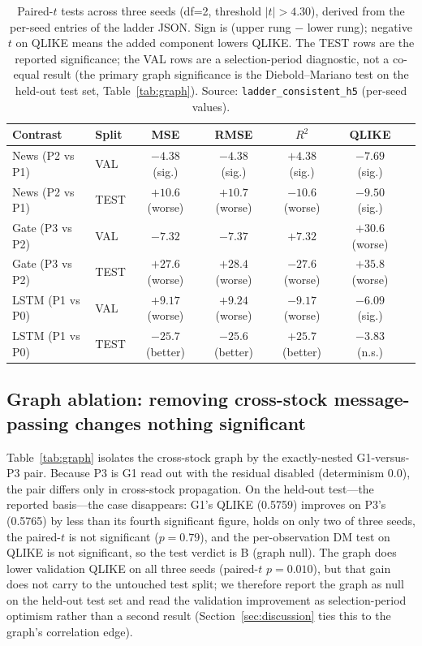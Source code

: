 \documentclass[runningheads]{llncs}
\newcommand{\GtestQ}{0.5759}     %
\newcommand{\PthreeTestQ}{0.5765}%
\newcommand{\graphTestP}{0.79}   %
\newcommand{\graphValP}{0.010}   %
\newcommand{\tcrit}{4.30}
\begin{document}
\begin{table}[t]
\caption{Paired-$t$ tests across three seeds (df=2, threshold $|t|>\tcrit$), derived from the per-seed
entries of the ladder JSON. Sign is (upper rung $-$ lower rung); negative $t$ on QLIKE means the added
component lowers QLIKE. The TEST rows are the reported significance; the VAL rows are a selection-period
diagnostic, not a co-equal result (the primary graph significance is the Diebold--Mariano test on the
held-out test set, Table~\ref{tab:graph}). Source: \texttt{ladder\_consistent\_h5} (per-seed values).}
\label{tab:pairedt}
\centering
\begin{tabular}{llccccc}
\toprule
Contrast & Split & MSE & RMSE & $R^2$ & QLIKE \\
\midrule
News (P2 vs P1) & VAL  & $-4.38$ (sig.) & $-4.38$ (sig.) & $+4.38$ (sig.) & $-7.69$ (sig.) \\
News (P2 vs P1) & TEST & $+10.6$ (worse) & $+10.7$ (worse) & $-10.6$ (worse) & $-9.50$ (sig.) \\
Gate (P3 vs P2) & VAL  & $-7.32$ & $-7.37$ & $+7.32$ & $+30.6$ (worse) \\
Gate (P3 vs P2) & TEST & $+27.6$ (worse) & $+28.4$ (worse) & $-27.6$ (worse) & $+35.8$ (worse) \\
LSTM (P1 vs P0) & VAL  & $+9.17$ (worse) & $+9.24$ (worse) & $-9.17$ (worse) & $-6.09$ (sig.) \\
LSTM (P1 vs P0) & TEST & $-25.7$ (better) & $-25.6$ (better) & $+25.7$ (better) & $-3.83$ (n.s.) \\
\bottomrule
\end{tabular}
\end{table}

\subsection{Graph ablation: removing cross-stock message-passing changes nothing significant}
\label{sec:graph}
Table~\ref{tab:graph} isolates the cross-stock graph by the exactly-nested G1-versus-P3 pair. Because P3
is G1 read out with the residual disabled (determinism $0.0$), the pair differs only in cross-stock
propagation. On the held-out test---the reported basis---the case disappears: G1's QLIKE (\GtestQ)
improves on P3's (\PthreeTestQ) by less than its fourth significant figure, holds on only two of three
seeds, the paired-$t$ is not significant ($p=\graphTestP$), and the per-observation DM test on QLIKE is
not significant, so the test verdict is B (graph null). The graph does lower validation QLIKE on all
three seeds (paired-$t$ $p=\graphValP$), but that gain does not carry to the untouched test split; we
therefore report the graph as null on the held-out test set and read the validation improvement as
selection-period optimism rather than a second result
(Section~\ref{sec:discussion} ties this to the graph's correlation edge).
\end{document}
